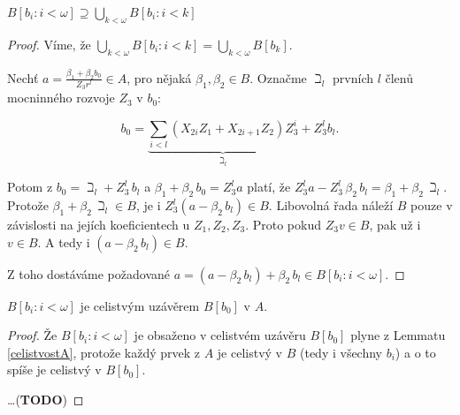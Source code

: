 \documentclass[11pt,a4paper]{article}
\theoremstyle{definition}
\theoremstyle{plain}
\begin{document}
\lemma[VII.7, jen strana nepožadující ($p=2$)] $B[b_i : i < \omega] \supseteq
\bigcup_{k < \omega} B[b_i : i < k]$
\begin{proof}
	Víme, že $\bigcup_{k < \omega} B[b_i : i < k] = \bigcup_{k < \omega}
	B[b_k]$.

	Nechť $a = \frac{\beta_1 + \beta_2 b_0}{Z_3r^l} \in A$, pro nějaká
	$\beta_1, \beta_2 \in B$. Označme $\beth_l$ prvních $l$ členů mocninného
	rozvoje $Z_3$ v $b_0$:
	
	\[
	b_0 = \underbrace{\sum_{i < l} (X_{2i} Z_1 + X_{2i+1} Z_2)
	Z_3^i}_{\beth_l} + Z_3^l b_l.
	\]

	Potom z $b_0 = \beth_l + Z_3^l\,b_l$ a $\beta_1 + \beta_2\,b_0 = Z_3^l a$
	platí, že $Z_3^l a - Z_3^l\,\beta_2\,b_l = \beta_1 + \beta_2\,\beth_l$.
	Protože $\beta_1 + \beta_2\,\beth_l \in B$, je i $Z_3^l (a - \beta_2\,b_l)
	\in B$. Libovolná řada náleží $B$ pouze v závislosti na jejích
	koeficientech u $Z_1, Z_2, Z_3$. Proto pokud $Z_3 v \in B$, pak už i $v \in
	B$. A tedy i $(a - \beta_2\,b_l) \in B$.

	Z toho dostáváme požadované $a = (a - \beta_2\,b_l) + \beta_2\,b_l \in B[b_i
	: i < \omega]$.
\end{proof}

\veta $B[b_i : i < \omega]$ je celistvým uzávěrem $B[b_0]$ v $A$.
\begin{proof}
	Že $B[b_i : i < \omega]$ je obsaženo v celistvém uzávěru $B[b_0]$ plyne z
	Lemmatu \ref{celistvostA}, protože každý prvek z $A$ je celistvý v $B$
	(tedy i všechny $b_i$) a o to spíše je celistvý v $B[b_0]$.

	\dots (\textbf{TODO})
\end{proof}
\end{document}

